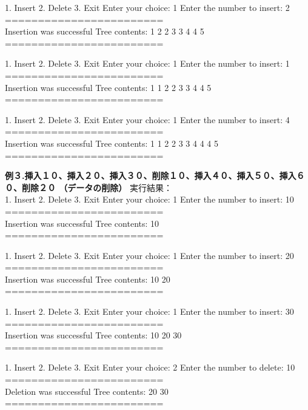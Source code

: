 \documentclass[]{jsarticle}
\begin{document}
1. Insert
2. Delete
3. Exit
Enter your choice: 1
Enter the number to insert: 2\\
========================\\
Insertion was successful
Tree contents: 1 2 2 3 3 4 4 5 \\
========================

1. Insert
2. Delete
3. Exit
Enter your choice: 1
Enter the number to insert: 1\\
========================\\
Insertion was successful
Tree contents: 1 1 2 2 3 3 4 4 5 \\
========================

1. Insert
2. Delete
3. Exit
Enter your choice: 1
Enter the number to insert: 4\\
========================\\
Insertion was successful
Tree contents: 1 1 2 2 3 3 4 4 4 5 \\
========================
\vspace*{3\baselineskip}

\noindent\textbf{例３.挿入１０、挿入２０、挿入３０、削除１０、挿入４０、挿入５０、挿入６０、削除２０ （データの削除）}
実行結果：\\
1. Insert
2. Delete
3. Exit
Enter your choice: 1
Enter the number to insert: 10\\
========================\\
Insertion was successful
Tree contents: 10 \\
========================

1. Insert
2. Delete
3. Exit
Enter your choice: 1
Enter the number to insert: 20\\
========================\\
Insertion was successful
Tree contents: 10 20 \\
========================

1. Insert
2. Delete
3. Exit
Enter your choice: 1
Enter the number to insert: 30\\
========================\\
Insertion was successful
Tree contents: 10 20 30 \\
========================

1. Insert
2. Delete
3. Exit
Enter your choice: 2
Enter the number to delete: 10\\
========================\\
Deletion was successful
Tree contents: 20 30 \\
========================
\end{document}
